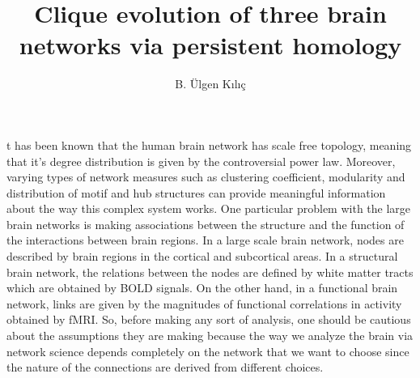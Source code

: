 \documentclass[9pt,twocolumn,twoside,lineno]{pnas-new}
\title{Clique evolution of three brain networks via persistent homology}
\author[a,1]{B. Ülgen Kılıç}
\affil[a]{University at Buffalo, Department of Mathematics}
\begin{document}
\maketitle
\thispagestyle{firststyle}

t has been known that the human brain network has scale free topology, meaning that it's degree distribution is given by the controversial power law. Moreover, varying types of network measures such as clustering coefficient, modularity and distribution of motif and hub structures can provide meaningful information about the way this complex system works. One particular problem with the large brain networks is making associations between the structure and the function of the interactions between brain regions. In a large scale brain network, nodes are described by brain regions in the cortical and subcortical areas. In a structural brain network, the relations between the nodes are defined by white matter tracts which are obtained by BOLD signals. On the other hand, in a functional brain network, links are given by the magnitudes of functional correlations in activity obtained by fMRI. So, before making any sort of analysis, one should be cautious about the assumptions they are making because the way we analyze the brain via network science depends completely on the network that we want to choose since the nature of the connections are derived from different choices.
\end{document}
